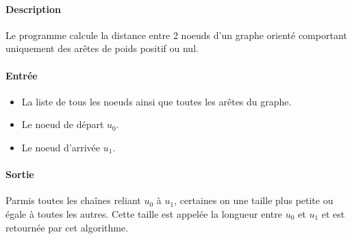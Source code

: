 \paragraph{Description}
Le programme calcule la distance entre 2 noeuds d'un graphe orienté comportant uniquement des arêtes de poids positif ou nul.

\paragraph{Entrée}
\begin{itemize}
  \item
    La liste de tous les noeuds ainsi que toutes les arêtes du graphe.
  \item
    Le noeud de départ $u_0$.
  \item
    Le noeud d'arrivée $u_1$.
\end{itemize}

\paragraph{Sortie}
Parmis toutes les chaînes reliant $u_0$ à $u_1$, certaines on une taille plus petite ou égale à toutes les autres.
Cette taille est appelée la longueur entre $u_0$ et $u_1$ et est retournée par cet algorithme.
